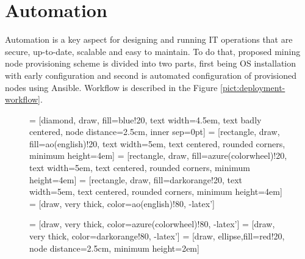 \documentclass[
  printed, %
  table,   %
  lof,     %
  lot,     %
           oneside, color
]{fithesis3}
\renewcommand{\texttt}[1]{%
  \begingroup
  \ttfamily
  \begingroup\lccode`~=`/\lowercase{\endgroup\def~}{/\discretionary{}{}{}}%
  \begingroup\lccode`~=`[\lowercase{\endgroup\def~}{[\discretionary{}{}{}}%
  \begingroup\lccode`~=`.\lowercase{\endgroup\def~}{.\discretionary{}{}{}}%
  \catcode`/=\active\catcode`[=\active\catcode`.=\active
  \scantokens{#1\noexpand}%
  \endgroup
}
\begin{document}
\section{Automation}
Automation is a key aspect for designing and running IT operations that are secure, up-to-date, scalable and easy to maintain. To do that, proposed mining node provisioning scheme is divided into two parts, first being OS installation with early configuration and second is automated configuration of provisioned nodes using Ansible. Workflow is described in the Figure \ref{pict:deployment-workflow}.
\begin{figure}[H]
\center
{} = [diamond, draw, fill=blue!20,
    text width=4.5em, text badly centered, node distance=2.5cm, inner sep=0pt]
 = [rectangle, draw, fill=ao(english)!20,
    text width=5em, text centered, rounded corners, minimum height=4em]
 = [rectangle, draw, fill=azure(colorwheel)!20,
    text width=5em, text centered, rounded corners, minimum height=4em]
 = [rectangle, draw, fill=darkorange!20,
    text width=5em, text centered, rounded corners, minimum height=4em]
 = [draw, very thick, color=ao(english)!80, -latex']

 = [draw, very thick, color=azure(colorwheel)!80, -latex']
 = [draw, very thick, color=darkorange!80, -latex']
 = [draw, ellipse,fill=red!20, node distance=2.5cm,
    minimum height=2em]

\end{figure}
\end{document}
